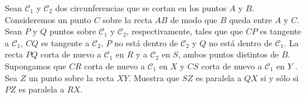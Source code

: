 Sean $\mathcal{C}_1$ y $\mathcal{C}_2$ dos circunferencias que se cortan en los puntos $A$ y $B$. Consideremos un punto $C$ sobre la recta $AB$ de modo que $B$ queda entre $A$ y $C$. Sean $P$ y $Q$ puntos sobre $\mathcal{C}_1$ y $\mathcal{C}_2$, respectivamente, tales que que $CP$ es tangente a $\mathcal{C}_1$, $CQ$ es tangente a $\mathcal{C}_2$, $P$ no está dentro de $\mathcal{C}_2$ y $Q$ no está dentro de $\mathcal{C}_1$. La recta $PQ$ corta de nuevo a $\mathcal{C}_1$ en $R$ y a $\mathcal{C}_2$ en $S$, ambos puntos distintos de $B$. Supongamos que $CR$ corta de nuevo a $\mathcal{C}_1$ en $X$ y $CS$ corta de nuevo a $\mathcal{C}_1$ en $Y$ . Sea $Z$ un punto sobre la recta $XY$. Muestra que $SZ$ es paralela a $QX$ si y sólo si $PZ$ es paralela a $RX$.
